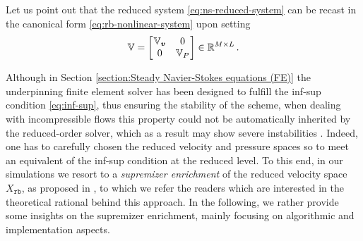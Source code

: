 \documentclass[12pt, a4paper, twoside, openright]{report}
\numberwithin{equation}{chapter}
\theoremstyle{theorem}
\theoremstyle{definition}
\theoremstyle{remark}
\theoremstyle{proposition}
\numberwithin{figure}{chapter}
\newcommand{\bg}[1]{\boldsymbol{#1}}
\begin{document}
		Let us point out that the reduced system \eqref{eq:ns-reduced-system} can be recast in the canonical form \eqref{eq:rb-nonlinear-system} upon setting
		\begin{equation*}
			\mathbb{V} = 
			\begin{bmatrix}
			\hspace*{-0.15cm}
			\begin{array}{cc}
				\mathbb{V}_{\bg{v}} & 0 \\
				0 & \mathbb{V}_P
			\end{array} 
			\hspace*{-0.15cm}
			\end{bmatrix} 
			\in \mathbb{R}^{M \times L} \, .
		\end{equation*}
		
		Although in Section \ref{section:Steady Navier-Stokes equations (FE)} the underpinning finite element solver has been designed to fulfill the inf-sup condition \eqref{eq:inf-sup}, thus ensuring the stability of the scheme, when dealing with incompressible flows this property could not be automatically inherited by the reduced-order solver, which as a result may show severe instabilities \cite{Bur06}. Indeed, one has to carefully chosen the reduced velocity and pressure spaces so to meet an equivalent of the inf-sup condition at the reduced level. To this end, in our simulations we resort to a \emph{supremizer enrichment} of the reduced velocity space $X_{\texttt{rb}}$, as proposed in \cite{Bal14}, to which we refer the readers which are interested in the theoretical rational behind this approach. In the following, we rather provide some insights on the supremizer enrichment, mainly focusing on algorithmic and implementation aspects.
		
\end{document}
